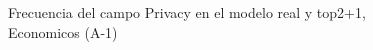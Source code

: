 \begin{figure}[H]
    \centering
    
    \caption{Frecuencia del campo Privacy en el modelo real y top2+1, Economicos (A-1)}
    \label{frecuency-Privacy-top2+1}
\end{figure}